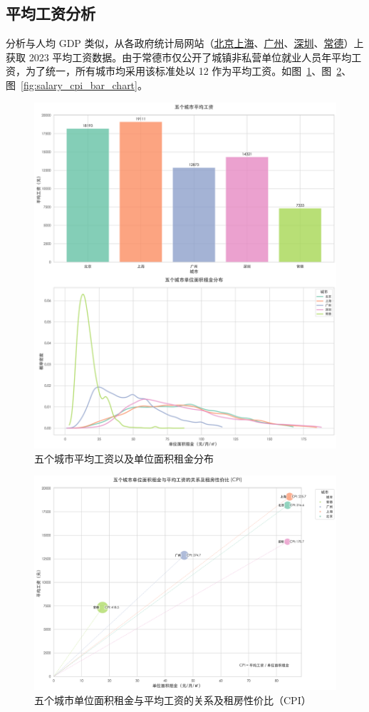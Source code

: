 \subsection{平均工资分析}
分析与人均 GDP 类似，从各政府统计局网站（\href{https://si12333.cn/policy/mfray.html}{北京上海}、\href{https://gz12345.gz.gov.cn/kmInterf/kmPointDetail.do?id=1400739&searchName=平均工资&0.053973112663851186}{广州}、\href{https://www.sz.gov.cn/cn/xxgk/zfxxgj/tjsj/tjgb/content/post_11398823.html}{深圳}、\href{https://tjj.changde.gov.cn/zhdt/sjdt/content_1069834}{常德}）上获取 2023 平均工资数据。由于常德市仅公开了城镇非私营单位就业人员年平均工资，为了统一，所有城市均采用该标准处以 12 作为平均工资。如图~\ref{fig:salary_unit_price_chart}、图~\ref{fig:salary_unit_price_scatter_chart}、图~\ref{fig:salary_cpi_bar_chart}。
\begin{figure}[htbp]
    \centering
    \includegraphics[width=0.7\linewidth]{../../figure/salary_unit_price_chart.png}
    \caption{五个城市平均工资以及单位面积租金分布}
    \label{fig:salary_unit_price_chart}
\end{figure}
\begin{figure}[htbp]
    \centering
    \includegraphics[width=0.7\linewidth]{../../figure/salary_unit_price_scatter_chart.png}
    \caption{五个城市单位面积租金与平均工资的关系及租房性价比（CPI）}
    \label{fig:salary_unit_price_scatter_chart}
\end{figure}
